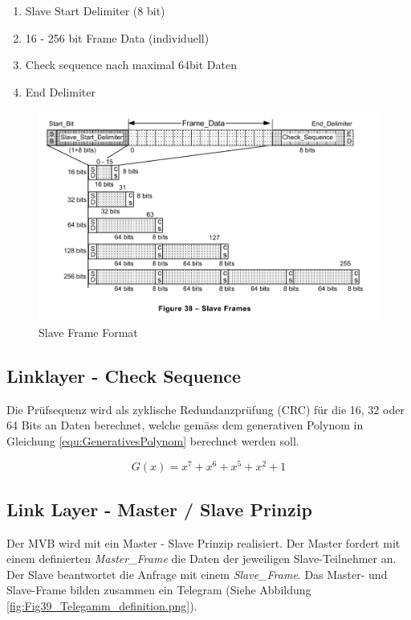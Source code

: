 \begin{enumerate}
    \item Slave Start Delimiter (8 bit)
    \item 16 - 256 bit Frame Data (individuell)
    \item Check sequence nach maximal 64bit Daten 
    \item End Delimiter
\end{enumerate}

\begin{figure}[H]
    \centering
    \includegraphics[width = 0.8 \textwidth]{Figures/Chap2/Grundlagen/MVB_DOKU/Frames und Telegramme/Fig38_SlaveFrameFormat.png}
    \caption{Slave Frame Format}
    \label{fig:SlaveFrameFormat}
\end{figure}

\subsection{Linklayer - Check Sequence}
\label{sub:CheckSequenz}
Die Prüfsequenz wird als zyklische Redundanzprüfung (CRC) für die 16, 32 oder 64 Bits an Daten berechnet, welche gemäss dem generativen Polynom in Gleichung \ref{equ:GenerativesPolynom} berechnet werden soll.

\begin{equation}
    G(x) = x^7 + x^6 + x^5 + x^2 + 1
    \label{equ:GenerativesPolynom}
\end{equation}

\subsection{Link Layer - Master / Slave Prinzip}
\label{sub:MasterSlavePrinzip}
Der MVB wird mit ein Master - Slave Prinzip realisiert. Der Master fordert mit einem definierten \textit{Master\_Frame} die Daten der jeweiligen Slave-Teilnehmer an. Der Slave beantwortet die Anfrage mit einem \textit{Slave\_Frame}. Das Master- und Slave-Frame bilden zusammen ein Telegram (Siehe Abbildung \ref{fig:Fig39_Telegamm_definition.png}). 

